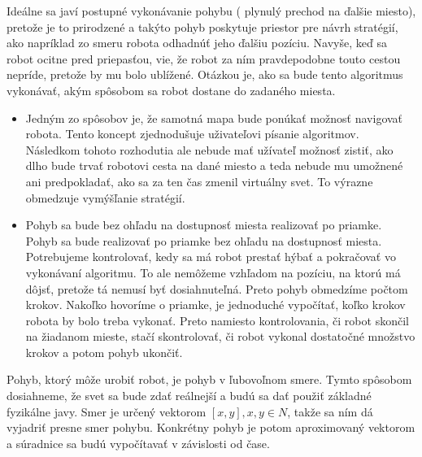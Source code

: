 Ideálne sa javí postupné vykonávanie pohybu ( plynulý prechod na ďalšie miesto), pretože je to prirodzené a takýto pohyb poskytuje priestor pre návrh stratégií, ako napríklad zo smeru robota odhadnúť jeho ďalšiu pozíciu. Navyše, keď sa robot ocitne pred priepasťou, vie, že robot za ním pravdepodobne touto cestou nepríde, pretože by mu bolo ublížené. Otázkou je, ako sa bude tento algoritmus vykonávať, akým spôsobom sa robot dostane do zadaného miesta. 
\begin{itemize} %
\item Jedným zo spôsobov je, že samotná mapa bude ponúkať možnosť navigovať robota. Tento koncept zjednodušuje uživateľovi písanie algoritmov. Následkom tohoto rozhodutia ale nebude mať užívateľ možnosť zistiť, ako dlho bude trvať robotovi cesta na dané miesto a teda nebude mu umožnené ani predpokladať, ako sa za ten čas zmenil virtuálny svet. To výrazne obmedzuje vymýšľanie stratégií. 
\item Pohyb sa bude bez ohľadu na dostupnosť miesta realizovať po priamke. Pohyb sa bude realizovať po priamke bez ohľadu na dostupnosť miesta. Potrebujeme kontrolovať, kedy sa má robot prestať hýbať a pokračovať vo vykonávaní algoritmu. To ale nemôžeme vzhľadom na pozíciu, na ktorú má dôjsť, pretože tá nemusí byť dosiahnuteľná. Preto pohyb obmedzíme počtom krokov. Nakoľko hovoríme o priamke, je jednoduché vypočítať, koľko krokov robota by bolo treba vykonať. Preto namiesto kontrolovania, či robot skončil na žiadanom mieste, stačí skontrolovať, či robot vykonal dostatočné množstvo krokov a potom pohyb ukončiť.
\end{itemize}
\indent Pohyb, ktorý môže urobiť robot, je pohyb v ľubovoľnom smere. Tymto spôsobom dosiahneme, že svet sa bude zdať reálnejší a budú sa dať použiť základné fyzikálne javy. Smer je určený vektorom $[x,y], x,y \in N $, takže sa ním dá vyjadriť presne smer pohybu. Konkrétny pohyb je potom aproximovaný vektorom a súradnice sa budú vypočítavať v závislosti od čase.\\ %
